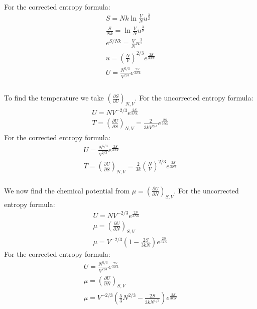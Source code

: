 \documentclass[a4paper,11pt]{article}
\numberwithin{equation}{section}
\begin{document}
For the corrected entropy formula:
\begin{gather}
 S=Nk\ln{\frac{V}{N}u^{\frac{3}{2}}}\\
 \frac{S}{Nk}=\ln{\frac{V}{N}u^{\frac{3}{2}}}\\
 e^{S/Nk}=\frac{V}{N}u^{\frac{3}{2}}\\
 u=(\frac{N}{V})^{2/3}e^{\frac{2S}{3Nk}}\\
 U=\frac{N^{5/3}}{V^{2/3}}e^{\frac{2S}{3Nk}}\\
\end{gather}
\\
To find the temperature we take $\left(\frac{\partial S}{\partial U}\right)_{N,V}$.
For the uncorrected entropy formula:
\begin{gather}
 U=NV^{-2/3}e^{\frac{2S}{3Nk}}\\
 T=\left(\frac{\partial U}{\partial S}\right)_{N,V}=
    \frac{2}{3kV^{2/3}}e^{\frac{2S}{3Nk}}
\end{gather}
For the corrected entropy formula:
\begin{gather}
 U=\frac{N^{5/3}}{V^{2/3}}e^{\frac{2S}{3Nk}}\\
 T=\left(\frac{\partial U}{\partial S}\right)_{N,V}=
  \frac{2}{3k}\left(\frac{N}{V}\right)^{2/3}  e^{\frac{2S}{3Nk}}
\end{gather}
\\
We now find the chemical potential from $\mu=(\frac{\partial U}{\partial N} )_{S,V}$.
For the uncorrected entropy formula:
\begin{gather}
 U=NV^{-2/3}e^{\frac{2S}{3Nk}}\\
 \mu = (\frac{\partial U}{\partial N} )_{S,V}\\
 \mu = V^{-2/3}\left(1-\frac{2S}{3kN} \right)e^{\frac{2S}{3kN}}
\end{gather}
For the corrected entropy formula:
\begin{gather}
 U=\frac{N^{5/3}}{V^{2/3}}e^{\frac{2S}{3Nk}}\\
 \mu = (\frac{\partial U}{\partial N} )_{S,V}\\
 \mu = V^{-2/3}\left(\frac{5}{3}N^{2/3}-\frac{2S}{3kN^{1/3}}   \right)e^{\frac{2S}{3kN}}
\end{gather}
\end{document}
